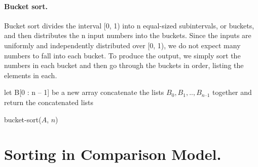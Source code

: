 \paragraph{Bucket sort.}
Bucket sort divides the interval [0, 1) into n equal-sized subintervals, or buckets, and then distributes the n input numbers into the buckets. Since the inputs are uniformly and independently distributed over [0, 1), we do not expect many numbers to fall into each bucket. To produce the output, we simply sort the numbers in each bucket and then go through the buckets in order, listing the elements in each.

  \begin{algorithm}
    	let B[0 : n – 1] be a new array
	\For{ $i \leftarrow [1, n]$}{
	    insert $A_{i}$ into list $B_{ \lfloor n A_{i} \rfloor} ]$
       	}
	concatenate the lists $B_{0}, B_{1}, .. , B_{n – 1}$ together and\\
	return the concatenated lists
\caption{bucket-sort($A$, $n$)}
  \end{algorithm}

%

\section{Sorting in Comparison Model.}

